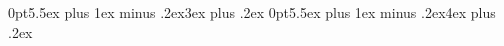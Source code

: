 \usepackage{etoolbox}
%
%
%
%

\usepackage{titlesec}
\titlespacing*{\section}
{0pt}{5.5ex plus 1ex minus .2ex}{3ex plus .2ex}
\titlespacing*{\subsection}
{0pt}{5.5ex plus 1ex minus .2ex}{4ex plus .2ex}

\newcommand{\exercise}[1]{%
    \def\@exercise{#1}%
    \subsection*{Exercise #1}
}

\newcommand{\subexercise}[1]{%
    \subsubsection*{Exercise \@oefening.#1}
}

\usepackage{fancyhdr}
\pagestyle{fancy}


\fancyhead[L]{\thepage} %
\fancyhead[R]{\name}    %
\fancyfoot[L]{}  	 %
\fancyfoot[R]{}          	 %
\fancyfoot[C]{}     	 %
\setlength{\headheight}{14pt}

%
\usepackage{todonotes}
\usepackage{tcolorbox}


\newenvironment{note}[1]{\begin{tcolorbox}[
    arc=0mm,
    colback=white,
    colframe=white!65!black,
    title=#1,
    breakable
]}{\end{tcolorbox}}

